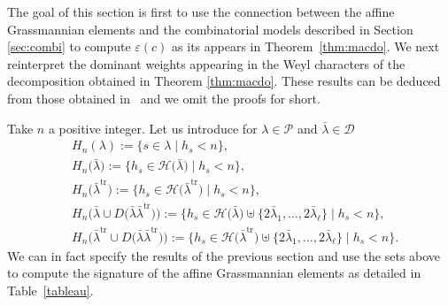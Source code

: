\documentclass[10pt,a4paper]{amsart}
\numberwithin{equation}{section}
\def\cch{\mathcal H}
\def\ccd{\mathcal {D}}
\def\ccp{\mathcal P}
\begin{document}
The goal of this section is first to use the connection between the affine Grassmannian elements and the combinatorial models described in Section \ref{sec:combi} to compute $\varepsilon(c)$ as its appears in Theorem~\ref{thm:macdo}. We next reinterpret the dominant weights appearing in the Weyl characters of the decomposition obtained in Theorem \ref{thm:macdo}. These results can be deduced from those obtained in~\cite{Wmac} and we omit the proofs for short.

Take $n$ a positive integer. Let us introduce for $\lambda\in\ccp$ and $\bar{\lambda}\in\ccd$
\begin{align*}
& H_n(\lambda):=\lbrace s\in\lambda\mid h_s<n\rbrace,\\
& H_n\bigl(\bar{\lambda}\bigr):=\bigl\lbrace h_s \in\cch\bigl(\bar{\lambda}\bigr)\mid h_s<n\bigr\rbrace,\\
& H_n\bigl(\bar{\lambda}^\mathrm{tr}\bigr):=\bigl\lbrace h_s \in\cch\bigl(\bar{\lambda}^{\mathrm{tr}}\bigr)\mid h_s<n\bigr\rbrace,\\
& H_n\bigl(\bar{\lambda}\cup D\bigl(\bar{\lambda}\bar{\lambda}^\mathrm{tr}\bigr)\bigr):=\bigl\lbrace h_s \in\cch\bigl(\bar{\lambda}\bigr)\uplus\bigl\lbrace 2\bar{\lambda}_1,\dots,2\bar{\lambda}_\ell\bigr\rbrace\mid h_s<n\bigr\rbrace,\\
& H_n\bigl(\bar{\lambda}^{\mathrm{tr}}\cup D\bigl(\bar{\lambda}\bar{\lambda}^\mathrm{tr}\bigr)\bigr):=\bigl\lbrace h_s \in\cch\bigl(\bar{\lambda}^{\mathrm{tr}}\bigr)\uplus\bigl\lbrace 2\bar{\lambda}_1,\dots,2\bar{\lambda}_\ell\bigr\rbrace\mid h_s<n\bigr\rbrace.
\end{align*}
We can in fact specify the results of the previous section and use the sets above to compute the signature of the affine Grassmannian elements as detailed in Table~\ref{tableau}.
\end{document}
